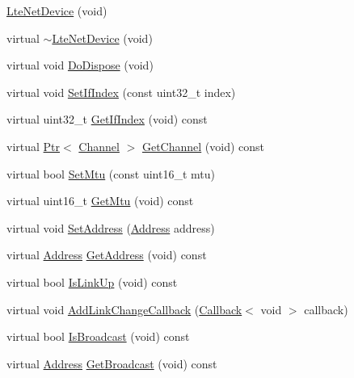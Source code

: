 \begin{DoxyCompactItemize}
\item 
\hyperlink{classns3_1_1LteNetDevice_a6e36295fe539e3936ffbf81a260c4d24}{Lte\+Net\+Device} (void)
\item 
virtual \hyperlink{classns3_1_1LteNetDevice_ab9fff968f488aa8b4d7b2d12ec9bc4cc}{$\sim$\+Lte\+Net\+Device} (void)
\item 
virtual void \hyperlink{classns3_1_1LteNetDevice_a57cac501c5c7a49206f2bd8d4c8bf7fe}{Do\+Dispose} (void)
\item 
virtual void \hyperlink{classns3_1_1LteNetDevice_ad4fdfe937f4f6238159f44205b6f05c9}{Set\+If\+Index} (const uint32\+\_\+t index)
\item 
virtual uint32\+\_\+t \hyperlink{classns3_1_1LteNetDevice_ad0c4a92837122244911a2c03f48c1038}{Get\+If\+Index} (void) const 
\item 
virtual \hyperlink{classns3_1_1Ptr}{Ptr}$<$ \hyperlink{classns3_1_1Channel}{Channel} $>$ \hyperlink{classns3_1_1LteNetDevice_ae9ee87852b4432759eacc54c6eee1047}{Get\+Channel} (void) const 
\item 
virtual bool \hyperlink{classns3_1_1LteNetDevice_a164e52b05cdbc626ddddb4f4ff4aa7b1}{Set\+Mtu} (const uint16\+\_\+t mtu)
\item 
virtual uint16\+\_\+t \hyperlink{classns3_1_1LteNetDevice_a327a4e152b2220bebfde2f9efab013fe}{Get\+Mtu} (void) const 
\item 
virtual void \hyperlink{classns3_1_1LteNetDevice_aa937a7835283631ef67300a98793de05}{Set\+Address} (\hyperlink{classns3_1_1Address}{Address} address)
\item 
virtual \hyperlink{classns3_1_1Address}{Address} \hyperlink{classns3_1_1LteNetDevice_a75ec8acd162e9214c5c2e329aac4377d}{Get\+Address} (void) const 
\item 
virtual bool \hyperlink{classns3_1_1LteNetDevice_a14e32a93e4cc93028684c12a2090f9e0}{Is\+Link\+Up} (void) const 
\item 
virtual void \hyperlink{classns3_1_1LteNetDevice_ac140a0b056c409912da95a5a0960e4ec}{Add\+Link\+Change\+Callback} (\hyperlink{classns3_1_1Callback}{Callback}$<$ void $>$ callback)
\item 
virtual bool \hyperlink{classns3_1_1LteNetDevice_ac83cfa28351f03374306ebf940ec20b4}{Is\+Broadcast} (void) const 
\item 
virtual \hyperlink{classns3_1_1Address}{Address} \hyperlink{classns3_1_1LteNetDevice_acdde6ad42dab5c3731eaba40c7cffa49}{Get\+Broadcast} (void) const 
\item 

\end{DoxyCompactItemize}
